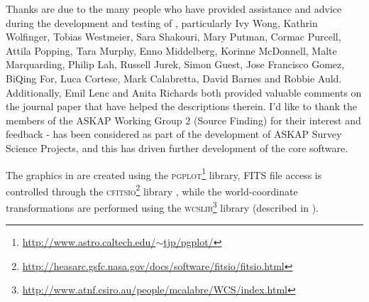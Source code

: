 %
%
%
%

Thanks are due to the many people who have provided assistance and
advice during the development and testing of \duchamp, particularly
Ivy Wong, Kathrin Wolfinger, Tobias Westmeier, Sara Shakouri, Mary
Putman, Cormac Purcell, Attila Popping, Tara Murphy, Enno Middelberg,
Korinne McDonnell, Malte Marquarding, Philip Lah, Russell Jurek, Simon
Guest, Jose Francisco Gomez, BiQing For, Luca Cortese, Mark
Calabretta, David Barnes and Robbie Auld. Additionally, Emil Lenc and
Anita Richards both provided valuable comments on the journal paper
that have helped the descriptions therein. I'd like to thank the
members of the ASKAP Working Group 2 (Source Finding) for their
interest and feedback - \duchamp has been considered as part of the
development of ASKAP Survey Science Projects, and this has driven
further development of the core \duchamp software.

The graphics in \duchamp are created using the
\textsc{pgplot}\footnote{\href{http://www.astro.caltech.edu/$\sim$tjp/pgplot/}{http://www.astro.caltech.edu/$\sim$tjp/pgplot/}}
library, FITS file access is controlled through the
\textsc{cfitsio}\footnote{\href{http://heasarc.gsfc.nasa.gov/docs/software/fitsio/fitsio.html}{http://heasarc.gsfc.nasa.gov/docs/software/fitsio/fitsio.html}}
library \citep{pence99}, while the world-coordinate transformations
are performed using the
\textsc{wcslib}\footnote{\href{http://www.atnf.csiro.au/people/mcalabre/WCS/index.html}{http://www.atnf.csiro.au/people/mcalabre/WCS/index.html}}
library (described in \citet{calabretta02}).


